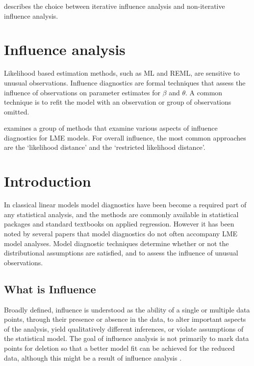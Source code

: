 \documentclass[12pt, a4paper]{article}
\begin{document}
\citet{schabenberger} describes the choice between  iterative influence analysis and  non-iterative influence analysis.







\section{Influence analysis} %

Likelihood based estimation methods, such as ML and REML, are sensitive to unusual observations. Influence diagnostics are formal techniques that assess the influence of observations on parameter estimates for $\beta$ and $\theta$. A common technique is to refit the model with an observation or group of observations omitted.

\citet{west} examines a group of methods that examine various aspects of influence diagnostics for LME models.
For overall influence, the most common approaches are the `likelihood distance' and the `restricted likelihood distance'.





\section{Introduction}%
In classical linear models model diagnostics have been become a required part of any statistical analysis, and the methods are commonly available in statistical packages and standard textbooks on applied regression. However it has been noted by several papers that model diagnostics do not often accompany LME model analyses.
Model diagnostic techniques determine whether or not the distributional assumptions are satisfied, and to assess the influence of unusual observations.

\subsection{What is Influence} %


Broadly defined, influence is understood as the ability of a single or multiple data points, through their presence or absence in the data, to alter important aspects of the analysis, yield qualitatively different inferences, or violate assumptions of the statistical model. The goal of influence analysis is not primarily to mark data
points for deletion so that a better model fit can be achieved for the reduced data, although this might be a result of influence analysis \citep{schabenberger}.
\end{document}
